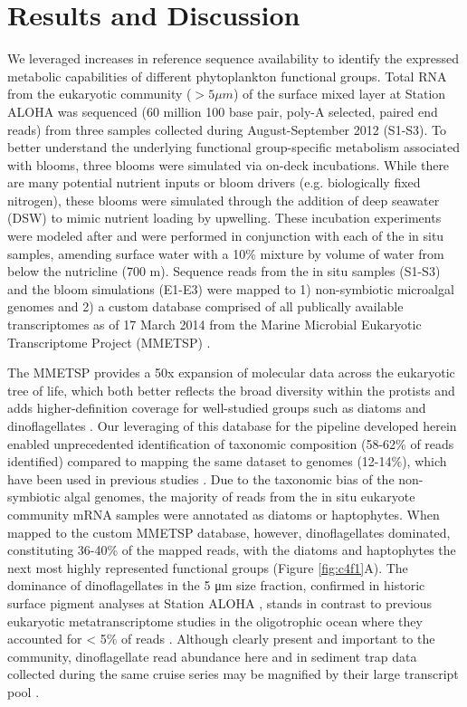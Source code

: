 \section{Results and Discussion}
We leveraged increases in reference sequence availability \citep{Keeling2014} to identify the expressed metabolic capabilities of different phytoplankton functional groups. Total RNA from the eukaryotic community ($>5 \mu m$) of the surface mixed layer at Station ALOHA was sequenced (60 million 100 base pair, poly-A selected, paired end reads) from three samples collected during August-September 2012 (S1-S3). To better understand the underlying functional group-specific metabolism associated with blooms, three blooms were simulated via on-deck incubations. While there are many potential nutrient inputs or bloom drivers (e.g. biologically fixed nitrogen), these blooms were simulated through the addition of deep seawater (DSW) to mimic nutrient loading by upwelling.  These incubation experiments were modeled after \citet{McAndrew2007} and were performed in conjunction with each of the in situ samples, amending surface water with a 10\% mixture by volume of water from below the nutricline (700 m). Sequence reads from the in situ samples (S1-S3) and the bloom simulations (E1-E3) were mapped to 1) non-symbiotic microalgal genomes and 2) a custom database comprised of all publically available transcriptomes as of 17 March 2014 from the Marine Microbial Eukaryotic Transcriptome Project (MMETSP) \citep{Keeling2014}.\par 
The MMETSP provides a 50x expansion of molecular data across the eukaryotic tree of life, which both better reflects the broad diversity within the protists and adds higher-definition coverage for well-studied groups such as diatoms and dinoflagellates \citep{Keeling2014}. Our leveraging of this database for the pipeline developed herein enabled unprecedented identification of taxonomic composition (58-62\% of reads identified) compared to mapping the same dataset to genomes (12-14\%), which have been used in previous studies \citep{Marchetti2012a}. Due to the taxonomic bias of the non-symbiotic algal genomes, the majority of reads from the in situ eukaryote community mRNA samples were annotated as diatoms or haptophytes. When mapped to the custom MMETSP database, however, dinoflagellates dominated, constituting 36-40\% of the mapped reads, with the diatoms and haptophytes the next most highly represented functional groups (Figure \ref{fig:c4f1}A). The dominance of dinoflagellates in the 5 μm size fraction, confirmed in historic surface pigment analyses at Station ALOHA \citep{Letelier1993}, stands in contrast to previous eukaryotic metatranscriptome studies in the oligotrophic ocean where they accounted for < 5\% of reads \citep{Marchetti2012a}. Although clearly present and important to the community, dinoflagellate read abundance here and in sediment trap data collected during the same cruise series \citep{Fontanez2015} may be magnified by their large transcript pool \citep{Moustafa2010, Hackett2004}. \par

